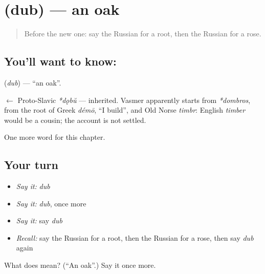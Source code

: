 \section[\texorpdfstring{\ru{дуб} (dub)}{дуб (dub)}]{ (dub) — an oak}

\label{lesson:RU-C195-dub}



\begin{quote}
Before the new one: say the Russian for a root, then the Russian for a rose.
\end{quote}

\subsection*{You'll want to know: }
\textbf{} (\emph{dub}) — \textquotedblleft{}an oak\textquotedblright{}.

\begin{cousinweb}
\textbf{} $\leftarrow$ Proto-Slavic \emph{*dǫbŭ} — inherited. Vasmer apparently starts from \emph{*dombros}, from the root of Greek \emph{démō}, \textquotedblleft{}I build\textquotedblright{}, and Old Norse \emph{timbr}: English \emph{timber} would be a cousin; the account is not settled.
\end{cousinweb}

\begin{grammarlens}[title={What you've built}]
One more word for this chapter.
\end{grammarlens}

\subsection*{Your turn}
\begin{itemize}
\raggedright
  \item \emph{Say it:} \emph{dub}
  \item \emph{Say it:} \emph{dub}, once more
  \item \emph{Say it:} say \emph{dub}
  \item \emph{Recall:} say the Russian for a root, then the Russian for a rose, then say \emph{dub} again
\end{itemize}

\begin{tcolorbox}[breakable,colback=teal!4,colframe=teal!35!black,title={Before you move on}]
What does  mean? (\textquotedblleft{}An oak\textquotedblright{}.) Say it once more.
\end{tcolorbox}
